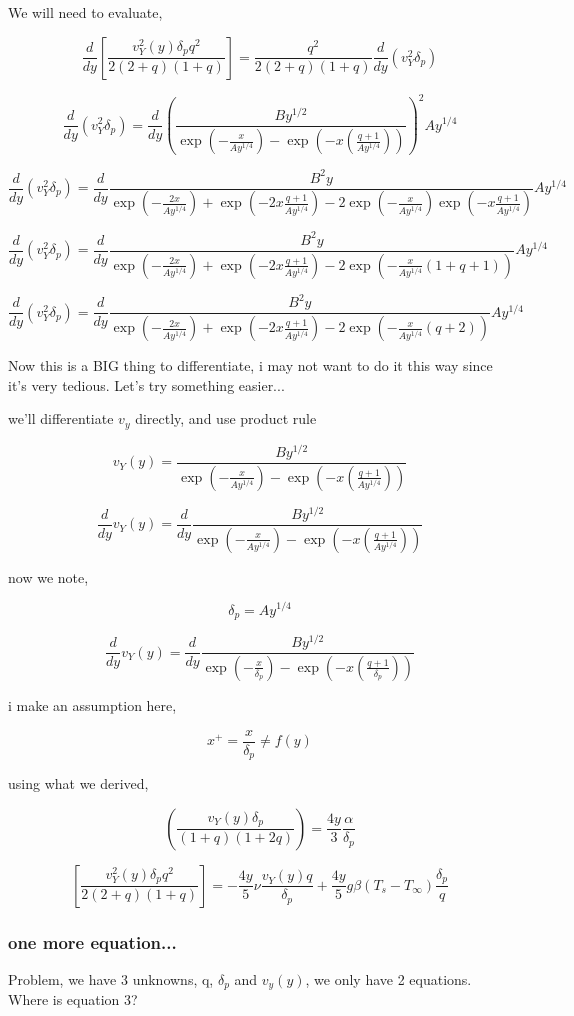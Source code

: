 \documentclass[11pt]{article}
\begin{document}
We will need to evaluate,

$$\frac{d}{dy} \left[  \frac{v_Y^2 (y) \delta_p q^2  }{2(2+q)(1+ q)} \right]  = \frac{q^2}{2(2+q)(1+ q)} \frac{d}{dy}(v_Y^2 \delta_p)$$

$$\frac{d}{dy}(v_Y^2 \delta_p) = \frac{d}{dy}( \frac{B y^{1/2} }{\exp (-\frac{x}{Ay^{1/4}})- \exp (-x (\frac{q+1}{Ay^{1/4}} ))} )^2 Ay^{1/4}$$

$$\frac{d}{dy}(v_Y^2 \delta_p) = \frac{d}{dy} \frac{B^2 y }{\exp (-\frac{2x}{Ay^{1/4}})+ \exp (-2x \frac{q+1}{Ay^{1/4}} ) -2 \exp (-\frac{x}{Ay^{1/4}})\exp (-x \frac{q+1}{Ay^{1/4}} ) }  Ay^{1/4}$$


$$\frac{d}{dy}(v_Y^2 \delta_p) = \frac{d}{dy} \frac{B^2 y }{\exp (-\frac{2x}{Ay^{1/4}})+ \exp (-2x \frac{q+1}{Ay^{1/4}} ) -2 \exp (-\frac{x}{Ay^{1/4}}(1 +q+1)) }  Ay^{1/4}$$

$$\frac{d}{dy}(v_Y^2 \delta_p) = \frac{d}{dy} \frac{B^2 y }{\exp (-\frac{2x}{Ay^{1/4}})+ \exp (-2x \frac{q+1}{Ay^{1/4}} ) -2 \exp (-\frac{x}{Ay^{1/4}}(q+2)) }  Ay^{1/4}$$

Now this is a BIG thing to differentiate, i may not want to do it this way since it's very tedious. Let's try something easier...

we'll differentiate $v_y$ directly, and use product rule

 $$v_Y (y) =  \frac{B y^{1/2} }{\exp (-\frac{x}{Ay^{1/4}})- \exp (-x (\frac{q+1}{Ay^{1/4}} ))}$$

 $$\frac{d}{dy} v_Y (y) = \frac{d}{dy} \frac{B y^{1/2} }{\exp (-\frac{x}{Ay^{1/4}})- \exp (-x (\frac{q+1}{Ay^{1/4}} ))}$$

now we note,

$$\delta_p = Ay^{1/4}$$

 $$\frac{d}{dy} v_Y (y) = \frac{d}{dy} \frac{B y^{1/2} }{\exp (-\frac{x}{\delta_p})- \exp (-x (\frac{q+1}{\delta_p} ))}$$

i make an assumption here,

$$x^+ = \frac{x}{\delta_p} \neq f(y)$$

using what we derived,

$$   ( \frac{ v_Y (y) \delta_p}{(1 + q)(1+2q)}  ) = \frac{4y}{3} \frac{\alpha}{\delta_p}$$


$$\left[  \frac{v_Y^2 (y) \delta_p q^2  }{2(2+q)(1+ q)} \right] = -\frac{4y}{5} \nu  \frac{ v_Y (y) q}{\delta_p} + \frac{4y}{5}  g\beta  (T_s -T_\infty) \frac{\delta_p}{q}$$


\subsubsection{one more equation...}
Problem, we have 3 unknowns, q, $\delta_p$ and $v_y(y)$, we only have 2 equations. Where is equation 3?
\end{document}
